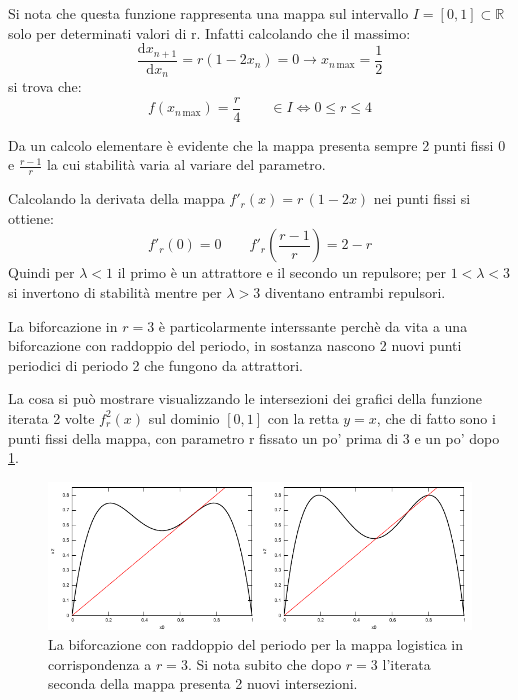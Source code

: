 \documentclass[13pt]{article}
\begin{document}
Si nota che questa funzione rappresenta una mappa sul intervallo $I=[0,1] \subset \mathbb{R}$ solo per determinati valori di r. Infatti calcolando che il massimo:
	\begin{displaymath}
		\dfrac{\textrm{d}x_{n+1}}{\textrm{d} x_{n}} = r(1-2x_{n})=0 \rightarrow x_{n \, \textrm{max}} = \dfrac{1}{2}
	\end{displaymath}
si trova che:
	\begin{displaymath}
		f(x_{n \, \textrm{max}}) = \dfrac{r}{4} \qquad \in I \Leftrightarrow 0\leq r \leq 4
	\end{displaymath}


Da un calcolo elementare è evidente che la mappa presenta sempre 2 punti fissi $0$ e $\frac{r-1}{r}$ la cui stabilità varia al variare del parametro.

Calcolando la derivata della mappa $f'_{r}(x) = r \, (1-2x) $ nei punti fissi si ottiene:
	\begin{equation}
		f'_{r}(0) = 0 \qquad f'_{r}(\frac{r-1}{r})= 2-r
	\end{equation}
Quindi per $\lambda < 1$ il primo è un attrattore e il secondo un repulsore; per $1 < \lambda < 3$ si invertono di stabilità mentre per $\lambda > 3$ diventano entrambi repulsori.

La biforcazione in $r = 3$ è particolarmente interssante perchè da vita a una biforcazione con raddoppio del periodo, in sostanza nascono 2 nuovi punti periodici di periodo 2 che fungono da attrattori.

La cosa si può mostrare visualizzando le intersezioni dei grafici della funzione iterata 2 volte $f^{2}_{r}(x)$ sul dominio $[0,1]$ con la retta $y=x$, che di fatto sono i punti fissi della mappa, con parametro r fissato un po' prima di 3 e un po' dopo \ref{fig:quadrobif}.

\begin{figure}[!h]
\centering
\includegraphics[width=13cm,keepaspectratio]{picture/quadrodispense}
\caption{La biforcazione con raddoppio del periodo per la mappa logistica in corrispondenza a $r =3$. Si nota subito che dopo $r =3$ l'iterata seconda della mappa presenta 2 nuovi intersezioni.}
\label{fig:quadrobif}
\end{figure}
\end{document}
